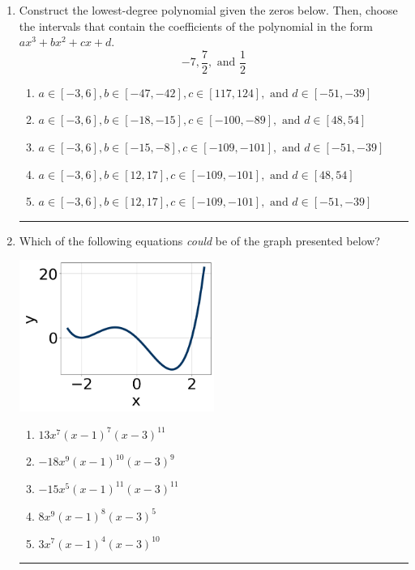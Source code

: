 \documentclass[14pt]{extbook}
\newcommand{\litem}[1]{\item#1\hspace*{-1cm}\rule{\textwidth}{0.4pt}}
\begin{document}
\begin{enumerate}
\litem{
Construct the lowest-degree polynomial given the zeros below. Then, choose the intervals that contain the coefficients of the polynomial in the form $ax^3+bx^2+cx+d$.\[ -7, \frac{7}{2}, \text{ and } \frac{1}{2} \]\begin{enumerate}[label=\Alph*.]
\item \( a \in [-3, 6], b \in [-47, -42], c \in [117, 124], \text{ and } d \in [-51, -39] \)
\item \( a \in [-3, 6], b \in [-18, -15], c \in [-100, -89], \text{ and } d \in [48, 54] \)
\item \( a \in [-3, 6], b \in [-15, -8], c \in [-109, -101], \text{ and } d \in [-51, -39] \)
\item \( a \in [-3, 6], b \in [12, 17], c \in [-109, -101], \text{ and } d \in [48, 54] \)
\item \( a \in [-3, 6], b \in [12, 17], c \in [-109, -101], \text{ and } d \in [-51, -39] \)

\end{enumerate} }
\litem{
Which of the following equations \textit{could} be of the graph presented below?
\begin{center}
    \includegraphics[width=0.5\textwidth]{../Figures/polyGraphToFunctionA.png}
\end{center}
\begin{enumerate}[label=\Alph*.]
\item \( 13x^{7} (x - 1)^{7} (x - 3)^{11} \)
\item \( -18x^{9} (x - 1)^{10} (x - 3)^{9} \)
\item \( -15x^{5} (x - 1)^{11} (x - 3)^{11} \)
\item \( 8x^{9} (x - 1)^{8} (x - 3)^{5} \)
\item \( 3x^{7} (x - 1)^{4} (x - 3)^{10} \)


\end{enumerate}}
\end{enumerate}
\end{document}
